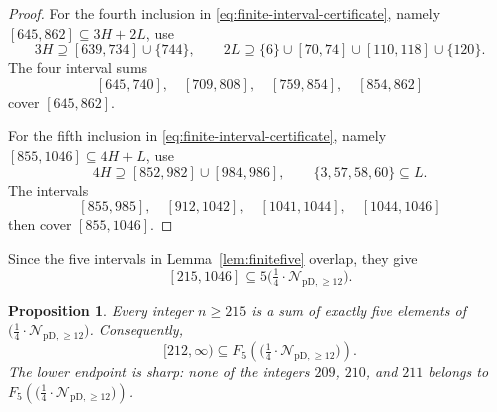 \documentclass[12pt]{article}
\theoremstyle{plain}
\newtheorem{proposition}[theorem]{Proposition}
\theoremstyle{definition}
\theoremstyle{plain}
\newcommand{\Pset}{%
  \bigl(\tfrac{1}{4}\cdot\mathcal{N}_{\mathrm{pD},\geq 12}\bigr)%
}
\begin{document}
\begin{proof}
For the fourth inclusion in
\eqref{eq:finite-interval-certificate}, namely
$[645,862]\subseteq3H+2L$, use
\[
 3H\supseteq[639,734]\cup\{744\},\qquad
 2L\supseteq\{6\}\cup[70,74]\cup[110,118]\cup\{120\}.
\]
The four interval sums
\[
 [645,740],\quad[709,808],\quad[759,854],\quad[854,862]
\]
cover $[645,862]$.

For the fifth inclusion in
\eqref{eq:finite-interval-certificate}, namely
$[855,1046]\subseteq4H+L$, use
\[
 4H\supseteq[852,982]\cup[984,986],
 \qquad \{3,57,58,60\}\subseteq L.
\]
The intervals
\[
 [855,985],\quad[912,1042],\quad[1041,1044],\quad[1044,1046]
\]
then cover $[855,1046]$.
\end{proof}

Since the five intervals in Lemma~\ref{lem:finitefive} overlap, they give
\[
 [215,1046]\subseteq5\Pset.
\]

\begin{proposition}\label{prop:fiveP}
Every integer $n\geq215$ is a sum of exactly five elements of $\Pset$.
Consequently,
\[
 [212,\infty)\subseteq F_5(\Pset).
\]
The lower endpoint is sharp: none of the integers $209$, $210$, and
$211$ belongs to $F_5(\Pset)$.
\end{proposition}
\end{document}
